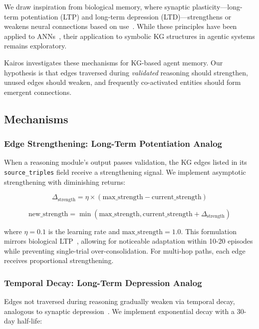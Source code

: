 \documentclass{article}
\begin{document}
We draw inspiration from biological memory, where synaptic plasticity—long-term potentiation (LTP) and long-term depression (LTD)—strengthens or weakens neural connections based on use~\citep{hebb1949organization,squire2015memory}. While these principles have been applied to ANNs~\citep{mvil2024hebbian}, their application to symbolic KG structures in agentic systems remains exploratory.

Kairos investigates these mechanisms for KG-based agent memory. Our hypothesis is that edges traversed during \textit{validated} reasoning should strengthen, unused edges should weaken, and frequently co-activated entities should form emergent connections.

\subsection{Mechanisms}

\subsubsection{Edge Strengthening: Long-Term Potentiation Analog}

When a reasoning module's output passes validation, the KG edges listed in its \texttt{source\_triples} field receive a strengthening signal. We implement asymptotic strengthening with diminishing returns:

\begin{equation}
\Delta_{\text{strength}} = \eta \times (\text{max\_strength} - \text{current\_strength})
\label{eq:ltp}
\end{equation}

\begin{equation}
\text{new\_strength} = \min(\text{max\_strength}, \text{current\_strength} + \Delta_{\text{strength}})
\end{equation}

where $\eta = 0.1$ is the learning rate and $\text{max\_strength} = 1.0$. This formulation mirrors biological LTP~\citep{squire2015memory}, allowing for noticeable adaptation within 10-20 episodes while preventing single-trial over-consolidation. For multi-hop paths, each edge receives proportional strengthening.

\subsubsection{Temporal Decay: Long-Term Depression Analog}

Edges not traversed during reasoning gradually weaken via temporal decay, analogous to synaptic depression~\citep{squire2015memory}. We implement exponential decay with a 30-day half-life:
\end{document}
